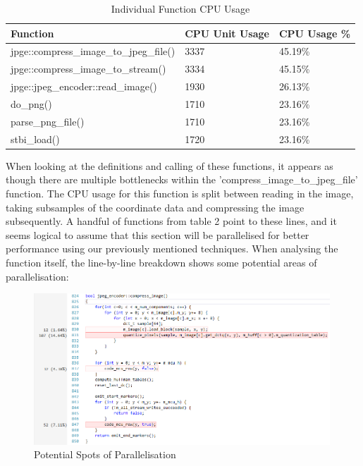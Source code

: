\documentclass[12pt, a4paper]{article}
\begin{document}
\begin{table}[H]
    \centering
    \begin{tabular}{| l | l | l |}
    \hline
    Function & CPU Unit Usage & CPU Usage \%  \\ \hline
    jpge::compress\_image\_to\_jpeg\_file() & 3337 & 45.19\% \\ \hline
    jpge::compress\_image\_to\_stream() & 3334 & 45.15\% \\ \hline
    jpge::jpeg\_encoder::read\_image() & 1930 & 26.13\% \\ \hline
    do\_png() & 1710 & 23.16\% \\ \hline
    parse\_png\_file() & 1710 & 23.16\% \\ \hline
    stbi\_load() & 1720 & 23.16\% \\ \hline
    \end{tabular}
    \caption{Individual Function CPU Usage}
\end{table}

When looking at the definitions and calling of these functions, it appears as though there are multiple bottlenecks within the 'compress\_image\_to\_jpeg\_file' function. The CPU usage for this function is split between reading in the image, taking subsamples of the coordinate data and compressing the image subsequently. A handful of functions from table 2 point to these lines, and it seems logical to assume that this section will be parallelised for better performance using our previously mentioned techniques. When analysing the function itself, the line-by-line breakdown shows some potential areas of parallelisation: \\

\begin{figure}[H]
	\centering
		\includegraphics[width=0.99\textwidth]{"potentialareas"}
		\caption{Potential Spots of Parallelisation}
\end{figure}
\end{document}
